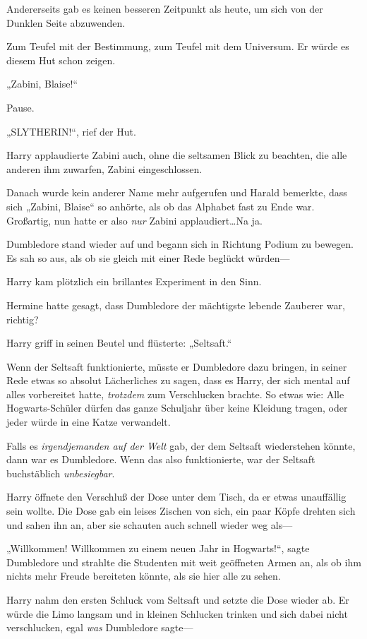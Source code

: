 {Andererseits gab es keinen besseren Zeitpunkt als heute, um sich von der Dunklen Seite abzuwenden.

Zum Teufel mit der Bestimmung, zum Teufel mit dem Universum. Er würde es diesem Hut schon zeigen.

„Zabini, Blaise!“

Pause.

„SLYTHERIN!“, rief der Hut.

Harry applaudierte Zabini auch, ohne die seltsamen Blick zu beachten, die alle anderen ihm zuwarfen, Zabini eingeschlossen.

Danach wurde kein anderer Name mehr aufgerufen und Harald bemerkte, dass sich „Zabini, Blaise“ so anhörte, als ob das Alphabet fast zu Ende war. Großartig, nun hatte er also \emph{nur} Zabini applaudiert…Na ja.

Dumbledore stand wieder auf und begann sich in Richtung Podium zu bewegen. Es sah so aus, als ob sie gleich mit einer Rede beglückt würden—

Harry kam plötzlich ein brillantes Experiment in den Sinn.

Hermine hatte gesagt, dass Dumbledore der mächtigste lebende Zauberer war, richtig?

Harry griff in seinen Beutel und flüsterte: „Seltsaft.“

Wenn der Seltsaft funktionierte, müsste er Dumbledore dazu bringen, in seiner Rede etwas so absolut Lächerliches zu sagen, dass es Harry, der sich mental auf alles vorbereitet hatte, \emph{trotzdem} zum Verschlucken brachte. So etwas wie: Alle Hogwarts-Schüler dürfen das ganze Schuljahr über keine Kleidung tragen, oder jeder würde in eine Katze verwandelt.

Falls es \emph{irgendjemanden auf der Welt} gab, der dem Seltsaft wiederstehen könnte, dann war es Dumbledore. Wenn das also funktionierte, war der Seltsaft buchstäblich \emph{unbesiegbar}.

Harry öffnete den Verschluß der Dose unter dem Tisch, da er etwas unauffällig sein wollte. Die Dose gab ein leises Zischen von sich, ein paar Köpfe drehten sich und sahen ihn an, aber sie schauten auch schnell wieder weg als—

„Willkommen! Willkommen zu einem neuen Jahr in Hogwarts!“, sagte Dumbledore und strahlte die Studenten mit weit geöffneten Armen an, als ob ihm nichts mehr Freude bereiteten könnte, als sie hier alle zu sehen.

Harry nahm den ersten Schluck vom Seltsaft und setzte die Dose wieder ab. Er würde die Limo langsam und in kleinen Schlucken trinken und sich dabei nicht verschlucken, egal \emph{was} Dumbledore sagte—

}
